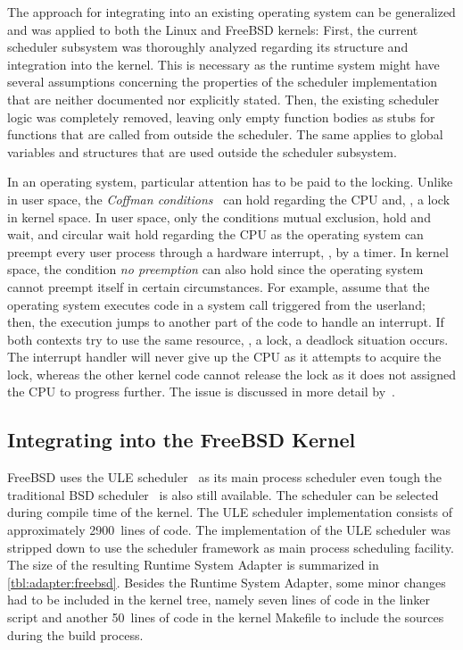 The approach for integrating \cobas{} into an existing operating system can be generalized and was applied to both the Linux and FreeBSD kernels: First, the current scheduler subsystem was thoroughly analyzed regarding its structure and integration into the kernel. This is necessary as the runtime system might have several assumptions concerning the properties of the scheduler implementation that are neither documented nor explicitly stated. Then, the existing scheduler logic was completely removed, leaving only empty function bodies as stubs for functions that are called from outside the scheduler. The same applies to global variables and structures that are used outside the scheduler subsystem.

In an operating system, particular attention has to be paid to the locking. Unlike in user space, the \emph{Coffman conditions}~\cite{Coffman-1971-Deadlock} can hold regarding the CPU and, \eg{}, a lock in kernel space. In user space, only the conditions mutual exclusion, hold and wait, and circular wait hold regarding the CPU as the operating system can preempt every user process through a hardware interrupt, \ie{}, by a timer. In kernel space, the condition \emph{no preemption} can also hold since the operating system cannot preempt itself in certain circumstances. For example, assume that the operating system executes code in a system call triggered from the userland; then, the execution jumps to another part of the code to handle an interrupt. If both contexts try to use the same resource, \eg{}, a lock, a deadlock situation occurs. The interrupt handler will never give up the CPU as it attempts to acquire the lock, whereas the other kernel code cannot release the lock as it does not assigned the CPU to progress further. The issue is discussed in more detail by~\textcite{Russell-2003-KernelLocking}.

\subsection{Integrating \cobas{} into the FreeBSD Kernel}

FreeBSD uses the ULE scheduler~\cite{Roberson-2003-ULE} as its main process scheduler even tough the traditional BSD scheduler~\cite[\cf{}][16\psq]{Mauro-2001-SolarisBSDSched} is also still available. The scheduler can be selected during compile time of the kernel. The ULE scheduler implementation consists of approximately \num{2900}~lines of code. The implementation of the ULE scheduler was stripped down to use the \cobas{} scheduler framework as main process scheduling facility. The size of the resulting Runtime System Adapter is summarized in \cref{tbl:adapter:freebsd}. Besides the Runtime System Adapter, some minor changes had to be included in the kernel tree, namely seven lines of code in the linker script and another \num{50}~lines of code in the kernel Makefile to include the \cobas{} sources during the build process.

